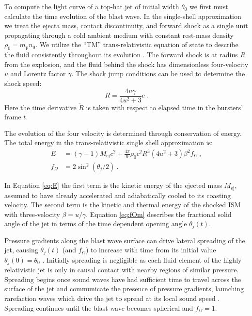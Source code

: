 \documentclass[twocolumn]{aastex62}
\newcommand{\Mej}{\ensuremath{M_{\mathrm{ej}}}}
\newcommand{\Mp}{\ensuremath{m_{\mathrm{p}}}}
\begin{document}
To compute the light curve of a top-hat jet of initial width $\theta_0$ we first must calculate the time evolution of the blast wave. In the single-shell approximation we treat the ejecta mass, contact discontinuity, and forward shock as a single unit propagating through a cold ambient medium with constant rest-mass density $\rho_0 = \Mp n_0$.  We utilize the ``TM'' trans-relativistic equation of state to describe the fluid consistently throughout its evolution \citep{Mignone:2005aa}.  The forward shock is at radius $R$ from the explosion, and the fluid behind the shock has dimensionless four-velocity $u$ and Lorentz factor $\gamma$.  The shock jump conditions can be used to determine the shock speed:
\begin{equation}
	\dot{R} = \frac{4 u \gamma}{4 u^2 +3}c\ . \label{eq:Rdot}
\end{equation}
Here the time derivative $\dot{R}$ is taken with respect to elapsed time in the bursters' frame $t$.  

 The evolution of the four velocity is determined through conservation of energy.  The total energy in the trans-relativistic single shell approximation is:
\begin{align}
	E &= (\gamma - 1)\Mej c^2 + \frac{4\pi}{9} \rho_0 c^2 R^3 (4 u^2 + 3) \beta^2 f_\Omega \ , \label{eq:E} \\
	f_\Omega &= 2 \sin^2\left( \theta_j / 2 \right)\ . \label{eq:fOm}
\end{align}

In Equation \eqref{eq:E} the first term is the kinetic energy of the ejected mass $\Mej$, assumed to have already accelerated and adiabatically cooled to its coasting velocity. The second term is the kinetic and thermal energy of the shocked ISM with three-velocity $\beta = u / \gamma$.  Equation \eqref{eq:fOm} describes the fractional solid angle of the jet in terms of the time dependent opening angle $\theta_j(t)$. 

Pressure gradients along the blast wave surface can drive lateral spreading of the jet, causing $\theta_j(t)$ (and $f_\Omega$) to increase with time  from its initial value $\theta_j(0) = \theta_0$ \citep{Rhoads:1999aa}.  Initially spreading is negligible as each fluid element of the highly relativistic jet is only in causal contact with nearby regions of similar pressure.  Spreading begins once sound waves have had sufficient time to travel across the surface of the jet and communicate the presence of pressure gradients, launching rarefaction waves which drive the jet to spread at its local sound speed \citep{Rhoads:1999aa, van-Eerten:2012aa, Duffell:2018aa}.  Spreading continues until the blast wave becomes spherical and $f_\Omega = 1$.
\end{document}
